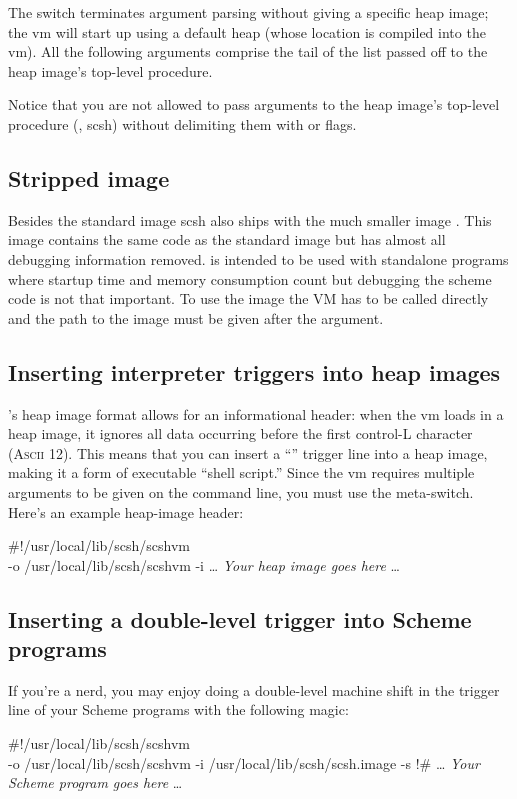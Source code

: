 The \ex{--} switch terminates argument parsing without giving
a specific heap image; the vm will start up using a default
heap (whose location is compiled into the vm).
All the following arguments comprise the tail of the list passed off to
the heap image's top-level procedure.

Notice that you are not allowed to pass arguments to the heap image's
top-level procedure (\eg, scsh) without delimiting them with 
or \ex{--} flags.

\subsection{Stripped image}

Besides the standard image  scsh also ships with the
much smaller image . This image contains the
same code as the standard image but has almost all debugging
information removed.  is intended to be used
with standalone programs where startup time and memory consumption
count but debugging the scheme code is not that important. To use the
image the VM has to be called directly and the path to the image must
be given after the  argument.

\subsection{Inserting interpreter triggers into heap images}
{\scm}'s heap image format allows for an informational header:
when the vm loads in a heap image, it ignores all data occurring before
the first control-L character (\textsc{Ascii} 12).
This means that you can insert a ``\ex{\#!}'' trigger line into a
heap image, making it a form of executable ``shell script.''
Since the vm requires multiple arguments to be given on the command
line, you must use the meta-switch.
Here's an example heap-image header:
\begin{code}
#!/usr/local/lib/scsh/scshvm \\
-o /usr/local/lib/scsh/scshvm -i
{\ldots} \textnormal{\emph{Your heap image goes here}} \ldots\end{code}

\subsection{Inserting a double-level trigger into Scheme programs}
If you're a nerd, you may enjoy doing a double-level machine shift
in the trigger line of your Scheme programs with the following magic:
\begin{code}\small
#!/usr/local/lib/scsh/scshvm \\
-o /usr/local/lib/scsh/scshvm -i /usr/local/lib/scsh/scsh.image -s
!#
{\ldots} \textnormal{\emph{Your Scheme program goes here}} \ldots\end{code}

